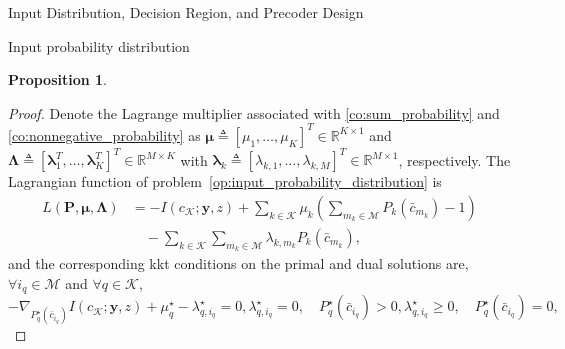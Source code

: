 \documentclass[journal]{IEEEtran}
\newtheorem{proposition}{Proposition}
\begin{document}
\begin{section}{Input Distribution, Decision Region, and Precoder Design}
\begin{subsection}{Input probability distribution}
\begin{proposition}
				\label{pr:optimal_conditions}
			\end{proposition}
			\begin{proof}
				Denote the Lagrange multiplier associated with \eqref{co:sum_probability} and \eqref{co:nonnegative_probability} as $\boldsymbol{\mu} \triangleq [\mu_1,\ldots,\mu_K]^T \in \mathbb{R}^{K \times 1}$ and $\boldsymbol{\Lambda} \triangleq [\boldsymbol{\lambda}_1^T,\ldots,\boldsymbol{\lambda}_K^T]^T \in \mathbb{R}^{M \times K}$ with $\boldsymbol{\lambda}_k \triangleq [\lambda_{k,1},\ldots,\lambda_{k,M}]^T \in \mathbb{R}^{M \times 1}$, respectively. The Lagrangian function of problem~\eqref{op:input_probability_distribution} is
				\begin{align}
					L(\boldsymbol{P},\boldsymbol{\mu},\boldsymbol{\Lambda})
					& = - I(c_{\mathcal{K}};\boldsymbol{y},z) + \sum_{k \in \mathcal{K}} \mu_k \left( \sum_{m_k \in \mathcal{M}} P_k(\bar{c}_{m_k}) - 1 \right)\nonumber\\
					& \quad - \sum_{k \in \mathcal{K}} \sum_{m_k \in \mathcal{M}} \lambda_{k,m_k} P_k(\bar{c}_{m_k}),
				\end{align}
				and the corresponding \gls{kkt} conditions on the primal and dual solutions are, $\forall i_q \in \mathcal{M}$ and $\forall q \in \mathcal{K}$,
				\begin{subequations}
					\begin{equation}
						- \nabla_{P_q^{\star}(\bar{c}_{i_q})} I(c_{\mathcal{K}};\boldsymbol{y},z) + \mu_q^{\star} - \lambda_{q,i_q}^{\star} = 0,
					\end{equation}
					\begin{equation}
						\lambda_{q,i_q}^{\star} = 0, \quad P_q^{\star}(\bar{c}_{i_q}) > 0,
					\end{equation}
					\begin{equation}
						\lambda_{q,i_q}^{\star} \ge 0, \quad P_q^{\star}(\bar{c}_{i_q}) = 0,

\end{equation}
\end{subequations}
\end{proof}
\end{subsection}
\end{section}
\end{document}
